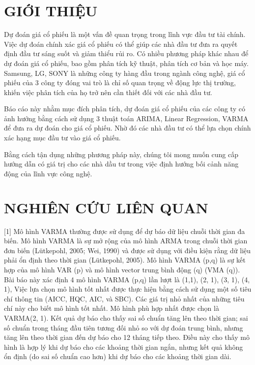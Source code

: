 \documentclass{article}
\begin{document}
\begin{multicols}{2}

\section{GIỚI THIỆU}
Dự đoán giá cổ phiếu là một vấn đề quan trọng trong lĩnh vực đầu tư tài chính. Việc dự đoán chính xác giá cổ phiếu có thể giúp các nhà đầu tư đưa ra quyết định đầu tư sáng suốt và giảm thiểu rủi ro. Có nhiều phương pháp khác nhau để dự đoán giá cổ phiếu, bao gồm phân tích kỹ thuật, phân tích cơ bản và học máy. Samsung, LG, SONY là những công ty hàng đầu trong ngành công nghệ, giá cổ phiếu của 3 công ty đóng vai trò là chỉ số quan trọng về động lực thị trường, khiến việc phân tích của họ trở nên cần thiết đối với các nhà đầu tư. 

Báo cáo này nhằm mục đích phân tích, dự đoán giá cổ phiếu của các công ty có ảnh hưởng bằng cách sử dụng 3 thuật toán ARIMA, Linear Regression, VARMA để đưa ra dự đoán cho giá cổ phiếu. Nhờ đó các nhà đầu tư có thể lựa chọn chính xác hạng mục đầu tư vào giá cổ phiếu. 

Bằng cách tận dụng những phương pháp này, chúng tôi mong muốn cung cấp hướng dẫn có giá trị cho các nhà dầu tư trong việc định hướng bối cảnh năng động của lĩnh vực công nghệ. 


\section{NGHIÊN CỨU LIÊN QUAN}


[1] Mô hình VARMA thường được sử dụng để dự báo dữ liệu chuỗi thời gian đa biến. Mô hình VARMA là sự mở rộng của mô hình ARMA trong chuỗi thời gian đơn biến (Lütkepohl, 2005; Wei, 1990) và được sử dụng với điều kiện rằng dữ liệu phải ổn định theo thời gian (Lütkepohl, 2005). Mô hình VARMA (p,q) là sự kết hợp của mô hình VAR (p) và mô hình vector trung bình động (q) (VMA (q)). Bài báo này xác định 4 mô hình VARMA (p,q) lần lượt là (1,1), (2, 1), (3, 1), (4, 1), Việc lựa chọn mô hình tốt nhất được thực hiện bằng cách sử dụng một số tiêu chí thông tin (AICC, HQC, AIC, và SBC). Các giá trị nhỏ nhất của những tiêu chí này cho biết mô hình tốt nhất. Mô hình phù hợp nhất được chọn là VARMA(2, 1). Kết quả dự báo cho thấy sai số chuẩn tăng lên theo thời gian; sai số chuẩn trong tháng đầu tiên tương đối nhỏ so với dự đoán trung bình, nhưng tăng lên theo thời gian đến dự báo cho 12 tháng tiếp theo. Điều này cho thấy mô hình là hợp lý khi dự báo cho các khoảng thời gian ngắn, nhưng kết quả không ổn định (do sai số chuẩn cao hơn) khi dự báo cho các khoảng thời gian dài.


\end{multicols}
\end{document}

